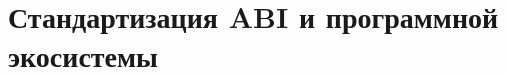 \documentclass[forwardcom.tex]{subfiles}
\begin{document}
\chapter{Стандартизация ABI и программной экосистемы} \label{StandardizationOfAbi}
%
%
%
%
%
%
%
%
%
%
%
%
%
%
%
%
%
\end{document}
